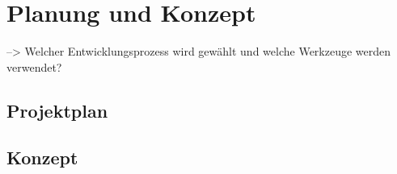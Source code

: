 \chapter{Planung und Konzept} \label{planung}
--> Welcher Entwicklungsprozess wird gewählt und welche Werkzeuge werden verwendet?


\section{Projektplan} \label{projektplan}



\section{Konzept} \label{vorgehensweise}
